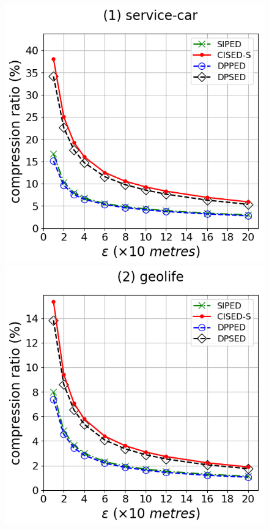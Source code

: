 {\begin{figure}[tb!]
\centering
\includegraphics[scale = 0.290]{Figures/Exp-CR-epsilon-ped-service.png}\hspace{1ex}
\includegraphics[scale = 0.290]{Figures/Exp-CR-epsilon-ped-geolife.png}\hspace{1ex}

\end{figure}}
